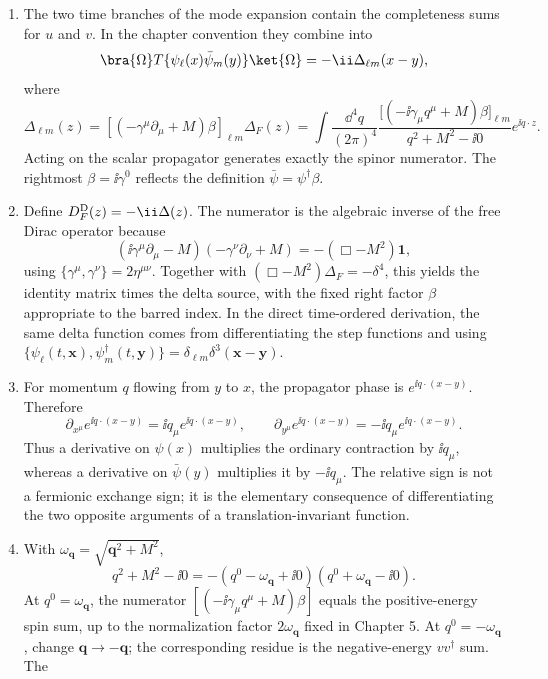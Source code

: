\begin{enumerate}
\begin{enumerate}
\item
The two time branches of the mode expansion contain the completeness
sums for \(u\) and \(v\).  In the chapter convention they combine into
\[
 \bra{\Omega}T\{\psi_\ell(x)\bar\psi_m(y)\}\ket{\Omega}
 =-\ii\Delta_{\ell m}(x-y),
\]
where
\[
 \Delta_{\ell m}(z)
 =\left[(-\gamma^\mu\partial_\mu+M)\beta\right]_{\ell m}
 \Delta_F(z)
 =\int\frac{\dd^4q}{(2\pi)^4}
 \frac{\bigl[(-\ii\gamma_\mu q^\mu+M)\beta\bigr]_{\ell m}}
 {q^2+M^2-\ii0}e^{\ii q\cdot z}.
\]
Acting on the scalar propagator generates exactly the spinor numerator.
The rightmost \(\beta=\ii\gamma^0\) reflects the definition
\(\bar\psi=\psi^\dagger\beta\).
\item
Define \(D_F^{\rm D}(z)=-\ii\Delta(z)\).  The numerator is the algebraic
inverse of the free Dirac operator because
\[
 (\ii\gamma^\mu\partial_\mu-M)
 (-\gamma^\nu\partial_\nu+M)
 =-(\Box-M^2)\mathbf{1},
\]
using \(\{\gamma^\mu,\gamma^\nu\}=2\eta^{\mu\nu}\).
Together with
\((\Box-M^2)\Delta_F=-\delta^4\), this yields the identity matrix times
the delta source, with the fixed right factor \(\beta\) appropriate to
the barred index.  In the direct time-ordered derivation, the same delta
function comes from differentiating the step functions and using
\(\{\psi_\ell(t,\mathbf x),\psi_m^\dagger(t,\mathbf y)\}
=\delta_{\ell m}\delta^3(\mathbf x-\mathbf y)\).
\item
For momentum \(q\) flowing from \(y\) to \(x\), the propagator phase is
\(e^{\ii q\cdot(x-y)}\).  Therefore
\[
 \partial_{x^\mu}e^{\ii q\cdot(x-y)}
 =\ii q_\mu e^{\ii q\cdot(x-y)},\qquad
 \partial_{y^\mu}e^{\ii q\cdot(x-y)}
 =-\ii q_\mu e^{\ii q\cdot(x-y)}.
\]
Thus a derivative on \(\psi(x)\) multiplies the ordinary contraction by
\(\ii q_\mu\), whereas a derivative on \(\bar\psi(y)\) multiplies it by
\(-\ii q_\mu\).  The relative sign is not a fermionic exchange sign; it is
the elementary consequence of differentiating the two opposite
arguments of a translation-invariant function.
\item
With \(\omega_{\mathbf q}=\sqrt{\mathbf q^2+M^2}\),
\[
 q^2+M^2-\ii0
 =-(q^0-\omega_{\mathbf q}+\ii0)(q^0+\omega_{\mathbf q}-\ii0).
\]
At \(q^0=\omega_{\mathbf q}\), the numerator
\([(-\ii\gamma_\mu q^\mu+M)\beta]\) equals the positive-energy spin sum,
up to the normalization factor \(2\omega_{\mathbf q}\) fixed in Chapter 5.
At \(q^0=-\omega_{\mathbf q}\), change \(\mathbf q\to-\mathbf q\); the
corresponding residue is the negative-energy \(v v^\dagger\) sum.  The

\end{enumerate}
\end{enumerate}

